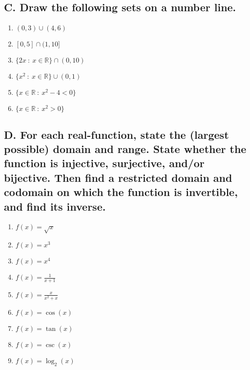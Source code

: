 \documentclass{article}
\newcommand{\R}{\mathbb{R}}
\begin{document}
\subsection*{C. Draw the following sets on a number line.}
\begin{multicols}{3}
\begin{enumerate}
    \item $(0,3)\cup (4,6)$
    \item $[0,5]\cap (1, 10]$
    \item $\{2x\ :\ x\in \R\}\cap(0,10)$
    \item $\{x^2\ :\ x\in\R\}\cup(0,1)$
    \item $\{x\in\R\ :\ x^2-4<0\}$
    \item $\{x\in\R\ :\ x^2 > 0\}$
\end{enumerate}

\end{multicols}


\subsection*{D. For each real-function, state the (largest possible) domain and range. State whether the function is injective, surjective, and/or bijective. Then find a restricted domain and codomain on which the function is invertible, and find its inverse.}
\begin{multicols}{3}
\begin{enumerate}
    \item $f(x)=\sqrt{x}$
    \item $f(x)=x^3$
    \item $f(x)=x^4$
    \item $f(x)=\frac{1}{x+1}$
    \item $f(x)=\frac{x}{x^2+x}$
    \item $f(x)=\cos(x)$
    \item $f(x)=\tan(x)$
    \item $f(x)=\csc(x)$
    \item $f(x)=\log_2(x)$
\end{enumerate}
\end{multicols}
\end{document}
